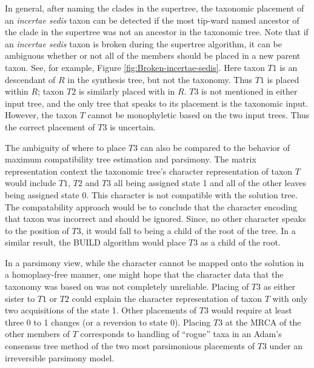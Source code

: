 \documentclass[english]{article}
\begin{document}
In general, after naming the clades in the supertree, the
    taxonomic placement of an \emph{incertae sedis} taxon
    can be detected if the most tip-ward named ancestor of
    the clade in the supertree was not an ancestor in the
    taxonomic tree.
Note that if an \emph{incertae sedis} taxon is broken
    during the supertree algorithm, it can be ambiguous whether
    or not all of the members should be placed in a new
    parent taxon.
See, for example, Figure \ref{fig:Broken-incertae-sedis}.
Here taxon $T1$ is an descendant of $R$ in the
synthesis tree, but not the taxonomy.
Thus $T1$ is placed within $R$; taxon
 $T2$ is similarly placed with in $R$.
$T3$ is not mentioned in either input tree, and the 
    only tree that speaks to its placement is the taxonomic input.
However, the taxon $T$ cannot be monophyletic based on the
     two input trees.
Thus the correct placement of $T3$ is uncertain.

The ambiguity of where to place $T3$ can also be compared to the
    behavior of maximum compatibility tree estimation and parsimony.
The matrix representation context the taxonomic tree's
    character representation of taxon $T$ would include $T1$, $T2$ and $T3$
    all being assigned state 1 and all of the other leaves being assigned 
    state 0.
This character is not compatible with the solution tree. 
The compatability approach would be to conclude that the character encoding 
    that taxon was incorrect and should be ignored.
Since, no other character speaks to the position of $T3$, it would fall to being
    a child of the root of the tree.
In a similar result, the BUILD algorithm would place $T3$ as a child of the root.

In a parsimony view, while the character cannot be mapped onto the solution in
    a homoplasy-free manner, one might hope that the character data that the
    taxonomy was based on was not completely unreliable.
Placing of $T3$ as either sister to $T1$ or $T2$ could explain the character
    representation of taxon $T$ with only two acquisitions of the state 1.
Other placements of $T3$ would require at least three 0 to 1 changes (or a reversion
    to state 0).
Placing $T3$ at the MRCA 
    of the other members of $T$ corresponds
    to handling of ``rogue'' taxa in an Adam's consensus tree \citep{Adams1972} method of the two
    most parsimonious placements of $T3$ under an irreversible parsimony model.



\end{document}
